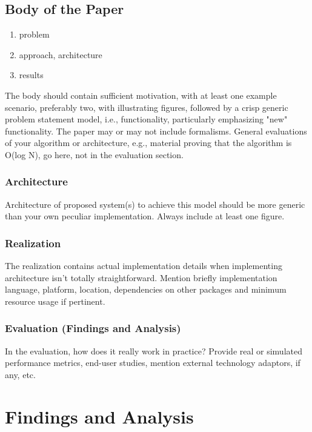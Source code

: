 \documentclass[conference,letterpaper]{IEEEtran}
\begin{document}
\subsection{Body of the Paper}
    \begin{enumerate}
        \item problem
        \item approach, architecture
        \item results
    \end{enumerate}
The body should contain sufficient motivation, with at least one example scenario, preferably two, with illustrating figures, followed by a crisp generic problem statement model, i.e., functionality, particularly emphasizing "new" functionality. The paper may or may not include formalisms. General evaluations of your algorithm or architecture, e.g., material proving that the algorithm is O(log N), go here, not in the evaluation section.
\subsubsection{Architecture}
Architecture of proposed system(s) to achieve this model should be more generic than your own peculiar implementation. Always include at least one figure.
\subsubsection{Realization}
The realization contains actual implementation details when implementing architecture isn't totally straightforward. Mention briefly implementation language, platform, location, dependencies on other packages and minimum resource usage if pertinent.
\subsubsection{Evaluation (Findings and Analysis)}
In the evaluation, how does it really work in practice? Provide real or simulated performance metrics, end-user studies, mention external technology adaptors, if any, etc.

\section{Findings and Analysis}
\end{document}
